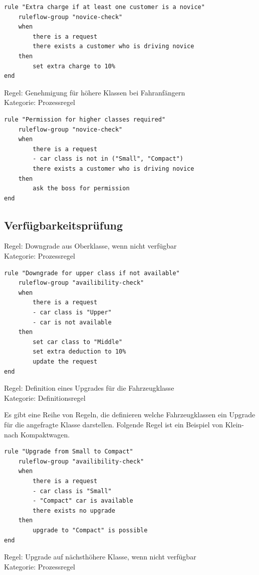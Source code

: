 \begin{lstlisting}
rule "Extra charge if at least one customer is a novice" 
	ruleflow-group "novice-check"
	when
		there is a request
		there exists a customer who is driving novice
	then
		set extra charge to 10%	
end
\end{lstlisting}

Regel: Genehmigung für höhere Klassen bei Fahranfängern \\
Kategorie: Prozessregel

\begin{lstlisting}
rule "Permission for higher classes required"
	ruleflow-group "novice-check"
	when
		there is a request
		- car class is not in ("Small", "Compact")
		there exists a customer who is driving novice
	then
		ask the boss for permission
end
\end{lstlisting}

\subsection{Verfügbarkeitsprüfung}

Regel: Downgrade aus Oberklasse, wenn nicht verfügbar \\
Kategorie: Prozessregel

\begin{lstlisting}
rule "Downgrade for upper class if not available"
	ruleflow-group "availibility-check"
	when
		there is a request
		- car class is "Upper"
		- car is not available
	then
		set car class to "Middle"
		set extra deduction to 10%
		update the request
end
\end{lstlisting}

Regel: Definition eines Upgrades für die Fahrzeugklasse \\
Kategorie: Definitionsregel

Es gibt eine Reihe von Regeln, die definieren welche Fahrzeugklassen ein Upgrade
für die angefragte Klasse darstellen. Folgende Regel ist ein Beispiel von
Klein- nach Kompaktwagen.

\begin{lstlisting}
rule "Upgrade from Small to Compact"
	ruleflow-group "availibility-check"
	when
		there is a request
		- car class is "Small"
		- "Compact" car is available
		there exists no upgrade
	then
		upgrade to "Compact" is possible	
end
\end{lstlisting}

Regel: Upgrade auf nächsthöhere Klasse, wenn nicht verfügbar \\
Kategorie: Prozessregel


